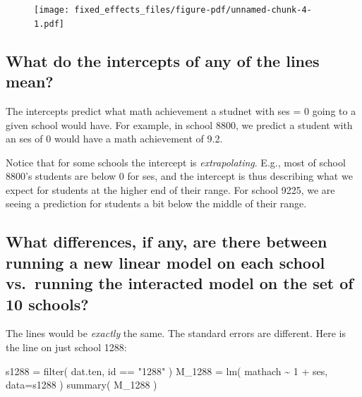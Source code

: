 \documentclass[
  letterpaper,
  DIV=11,
  numbers=noendperiod]{scrreprt}
\newenvironment{Shaded}{\begin{snugshade}}{\end{snugshade}}
\newcommand{\AttributeTok}[1]{\textcolor[rgb]{0.49,0.56,0.16}{#1}}
\newcommand{\DecValTok}[1]{\textcolor[rgb]{0.25,0.63,0.44}{#1}}
\newcommand{\FunctionTok}[1]{\textcolor[rgb]{0.02,0.16,0.49}{#1}}
\newcommand{\NormalTok}[1]{\textcolor[rgb]{0.00,0.44,0.13}{#1}}
\newcommand{\OtherTok}[1]{\textcolor[rgb]{0.00,0.44,0.13}{#1}}
\newcommand{\SpecialCharTok}[1]{\textcolor[rgb]{0.25,0.44,0.63}{#1}}
\newcommand{\StringTok}[1]{\textcolor[rgb]{0.25,0.44,0.63}{#1}}
\begin{document}
\begin{figure}[H]

{\centering \texttt{[image: fixed\_effects\_files/figure-pdf/unnamed-chunk-4-1.pdf]}

}

\end{figure}

\hypertarget{what-do-the-intercepts-of-any-of-the-lines-mean}{%
\subsection{What do the intercepts of any of the lines
mean?}\label{what-do-the-intercepts-of-any-of-the-lines-mean}}

The intercepts predict what math achievement a studnet with ses = 0
going to a given school would have. For example, in school 8800, we
predict a student with an ses of 0 would have a math achievement of 9.2.

Notice that for some schools the intercept is \emph{extrapolating}.
E.g., most of school 8800's students are below 0 for ses, and the
intercept is thus describing what we expect for students at the higher
end of their range. For school 9225, we are seeing a prediction for
students a bit below the middle of their range.

\hypertarget{what-differences-if-any-are-there-between-running-a-new-linear-model-on-each-school-vs.-running-the-interacted-model-on-the-set-of-10-schools}{%
\subsection{What differences, if any, are there between running a new
linear model on each school vs.~running the interacted model on the set
of 10
schools?}\label{what-differences-if-any-are-there-between-running-a-new-linear-model-on-each-school-vs.-running-the-interacted-model-on-the-set-of-10-schools}}

The lines would be \emph{exactly} the same. The standard errors are
different. Here is the line on just school 1288:

\begin{Shaded}
\begin{Highlighting}[]
\NormalTok{s1288 }\OtherTok{=} \FunctionTok{filter}\NormalTok{( dat.ten, id }\SpecialCharTok{==} \StringTok{"1288"}\NormalTok{ )}
\NormalTok{M\_1288 }\OtherTok{=} \FunctionTok{lm}\NormalTok{( mathach }\SpecialCharTok{\textasciitilde{}} \DecValTok{1} \SpecialCharTok{+}\NormalTok{ ses, }\AttributeTok{data=}\NormalTok{s1288 )}
\FunctionTok{summary}\NormalTok{( M\_1288 )}
\end{Highlighting}
\end{Shaded}
\end{document}
